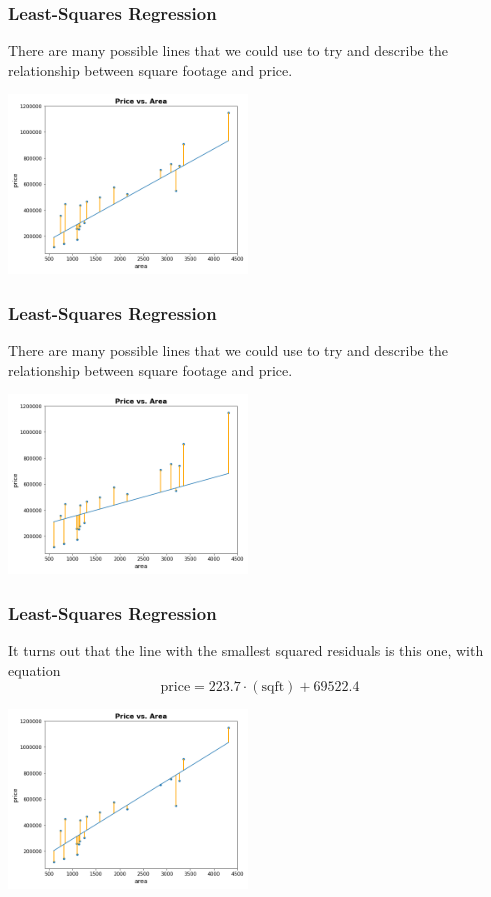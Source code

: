 \documentclass[11pt, table]{beamer}
\begin{document}
\begin{frame}
\frametitle{Least-Squares Regression}
There are many possible lines that we could use to try and describe the relationship between square footage and price.

\begin{center}
	\includegraphics[width=2.5in]{images/Appraisal_Values/resid_02.png}
\end{center}
\end{frame}


\begin{frame}
\frametitle{Least-Squares Regression}
There are many possible lines that we could use to try and describe the relationship between square footage and price.

\begin{center}
	\includegraphics[width=2.5in]{images/Appraisal_Values/resid_03.png}
\end{center}
\end{frame}

\begin{frame}
\frametitle{Least-Squares Regression}
It turns out that the line with the smallest squared residuals is this one, with equation
$$\text{price} = 223.7\cdot(\text{sqft}) + 69522.4$$

\begin{center}
	\includegraphics[width=2.5in]{images/Appraisal_Values/resid_04.png}
\end{center}
\end{frame}
\end{document}
